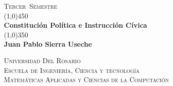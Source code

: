\documentclass[a4paper]{book}
\newcommand{\titPag}{
    \begin{titlepage}
        \begin{flushright}
            \textsc{\large {\semestre\ Semestre}}\\
            \line(1,0){450} \\
            [0.635cm]
            \huge{\bfseries \asignatura} \\
            [0.2cm]
            \line(1,0){350} \\
            \LARGE{\bfseries \autor} \\
            [16.25cm]
        \end{flushright}
        \begin{flushright}
        \textsc{
            \universidad \\
            [0.1cm]
            \escuela \\
            [0.1cm]
            \carrera
        }
        \end{flushright}
    \end{titlepage}
}
\newcommand{\asignatura}{Constitución Política e Instrucción Cívica}
\newcommand{\autor}{Juan Pablo Sierra Useche}
\newcommand{\semestre}{Tercer}
\newcommand{\universidad}{Universidad Del Rosario}
\newcommand{\escuela}{Escuela de Ingeniería, Ciencia y tecnología}
\newcommand{\carrera}{Matemáticas Aplicadas y Ciencias de la Computación}
\begin{document}
    \titPag
    \tableofcontents







    \printbibliography
\end{document}
